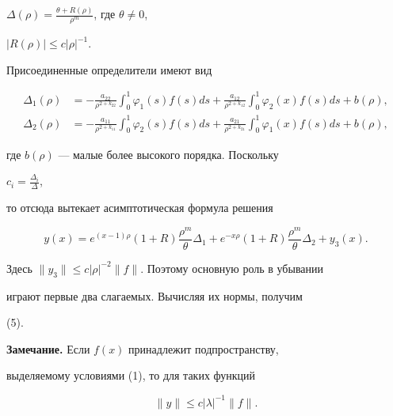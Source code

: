 \begin{pf}
$\Delta(\rho)=\frac{\theta+R(\rho)}{\rho^m}$, где $\theta\ne0$, 


$|R(\rho)|\le c|\rho|^{-1}$. 


Присоединенные определители имеют вид 


\begin{align*} 


\Delta_1(\rho)&=-\frac{a_{22}}{\rho^{2+k_{22}}} 


\int^1_0\varphi_1(s)f(s)ds+ 


\frac{a_{12}}{\rho^{2+k_{12}}}\int^1_0 


\varphi_2(x)f(s)ds+b(\rho),\\ 


% 


\Delta_2(\rho)&=-\frac{a_{11}}{\rho^{2+k_{11}}} 


\int^1_0\varphi_2(s)f(s)ds+ 


\frac{a_{21}}{\rho^{2+k_{21}}}\int^1_0 


\varphi_1(x)f(s)ds+b(\rho),


\end{align*} 


где $b(\rho)$ --- малые более высокого порядка. Поскольку 


$c_i=\frac{\Delta_i}{\Delta}$, 


то отсюда вытекает асимптотическая формула решения 


$$ 


y(x)=e^{(x-1)\rho}(1+R)\frac{\rho^m}{\theta}\Delta_1+ 


e^{-x\rho}(1+R)\frac{\rho^m}{\theta}\Delta_2+y_3(x). 


$$ 


Здесь $\|y_3\|\le c|\rho|^{-2}\|f\|$. Поэтому основную роль в убывании 


играют первые два слагаемых. Вычисляя их нормы, получим  


(5).  


\end{pf} 


 


{\bf Замечание.} Если $f(x)$ принадлежит подпространству, 


выделяемому условиями (1), то для таких функций 


$$ 


\|y\|\le c|\lambda|^{-1}\|f\|. 


$$ 


\medskip 


